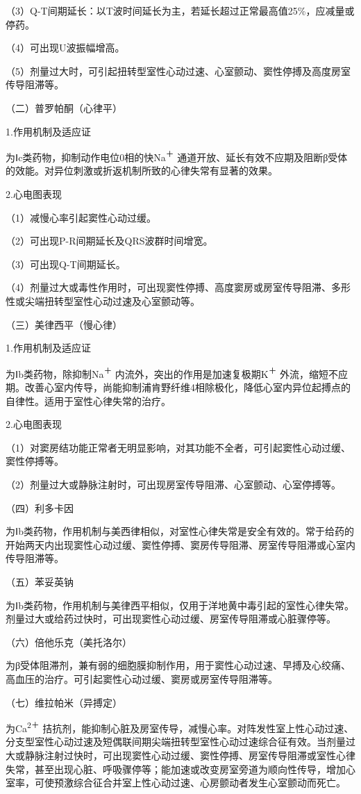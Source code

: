 （3）Q-T间期延长：以T波时间延长为主，若延长超过正常最高值25\%，应减量或停药。

（4）可出现U波振幅增高。

（5）剂量过大时，可引起扭转型室性心动过速、心室颤动、窦性停搏及高度房室传导阻滞等。

（二）普罗帕酮（心律平）

1.作用机制及适应证

为Ⅰc类药物，抑制动作电位0相的快Na\textsuperscript{＋}
通道开放、延长有效不应期及阻断β受体的效能。对异位刺激或折返机制所致的心律失常有显著的效果。

2.心电图表现

（1）减慢心率引起窦性心动过缓。

（2）可出现P-R间期延长及QRS波群时间增宽。

（3）可出现Q-T间期延长。

（4）剂量过大或毒性作用时，可出现窦性停搏、高度窦房或房室传导阻滞、多形性或尖端扭转型室性心动过速及心室颤动等。

（三）美律西平（慢心律）

1.作用机制及适应证

为Ⅰb类药物，除抑制Na\textsuperscript{＋}
内流外，突出的作用是加速复极期K\textsuperscript{＋}
外流，缩短不应期。改善心室内传导，尚能抑制浦肯野纤维4相除极化，降低心室内异位起搏点的自律性。适用于室性心律失常的治疗。

2.心电图表现

（1）对窦房结功能正常者无明显影响，对其功能不全者，可引起窦性心动过缓、窦性停搏等。

（2）剂量过大或静脉注射时，可出现房室传导阻滞、心室颤动、心室停搏等。

（四）利多卡因

为Ⅰb类药物，作用机制与美西律相似，对室性心律失常是安全有效的。常于给药的开始两天内出现窦性心动过缓、窦性停搏、窦房传导阻滞、房室传导阻滞或心室内传导阻滞等。

（五）苯妥英钠

为Ⅰb类药物，作用机制与美律西平相似，仅用于洋地黄中毒引起的室性心律失常。剂量过大或给药过快时，可出现窦性心动过缓、房室传导阻滞或心脏骤停等。

（六）倍他乐克（美托洛尔）

为β受体阻滞剂，兼有弱的细胞膜抑制作用，用于窦性心动过速、早搏及心绞痛、高血压的治疗。可引起窦性心动过缓、窦房或房室传导阻滞等。

（七）维拉帕米（异搏定）

为Ca\textsuperscript{2＋}
拮抗剂，能抑制心脏及房室传导，减慢心率。对阵发性室上性心动过速、分支型室性心动过速及短偶联间期尖端扭转型室性心动过速综合征有效。当剂量过大或静脉注射过快时，可出现窦性心动过缓、窦性停搏、房室传导阻滞或室性心律失常，甚至出现心脏、呼吸骤停等；能加速或改变房室旁道为顺向性传导，增加心室率，可使预激综合征合并室上性心动过速、心房颤动者发生心室颤动而死亡。

